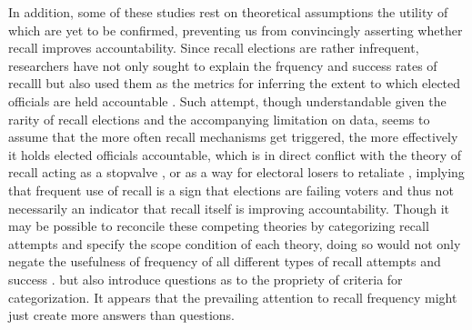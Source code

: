 \documentclass[hyphens, crop=false]{standalone}
\begin{document}
	
	In addition,
	some of these studies rest on theoretical assumptions
	the utility of which are yet to be confirmed,
	preventing us from convincingly asserting
	whether recall improves accountability.
	Since recall elections are rather infrequent,
	researchers have not only sought to explain
	the frquency and success rates of recalll
	but also used them
	as the metrics for inferring 
	the extent to which elected officials are held accountable
	\autocite{hamanRecallElectionsTool2021,okamotoRecallJapanMeasure2020,qvortrupHastaVistaComparative2011}.
	Such attempt,
	though understandable given the rarity of recall elections and the accompanying limitation on data,
	seems to assume that the more often recall mechanisms get triggered,
	the more effectively it holds elected officials accountable,
	which is in direct conflict with
	the theory of recall acting as a stopvalve 
	\autocite{serdultHistoryDormantInstitution2015, welpRecallDemocraticAdvance2020},
	or as a way for electoral losers to retaliate
	\autocite{welpRecallReferendumsPeruvian2016},
	implying that frequent use of recall is a sign that elections are failing voters and thus
	not necessarily an indicator that recall itself is improving accountability.
	Though it may be possible to reconcile these competing theories by 
	categorizing recall attempts and 
	specify the scope condition of each theory,
	doing so would not only
	negate the usefulness of frequency of all different types of recall attempts and success .
	but also
	introduce questions as to the propriety of criteria for categorization. 
	It appears that the prevailing attention to recall frequency
	might just create more answers than questions.
	
\end{document}
